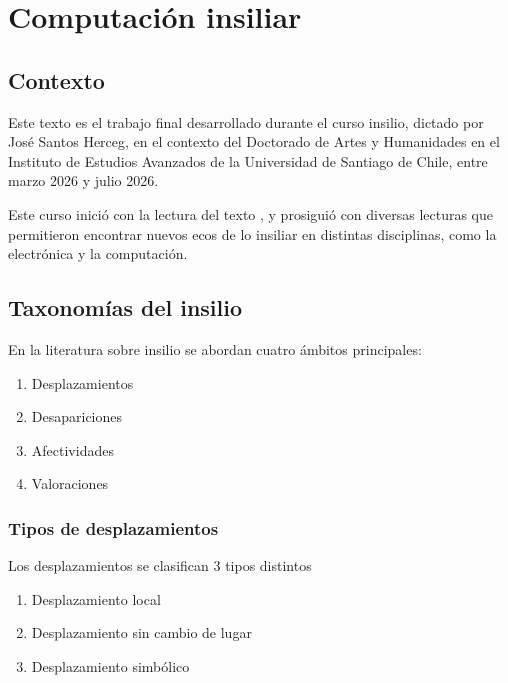 \documentclass[./informes.tex]{subfiles}
\begin{document}

\chapter{Computación insiliar}

\section{Contexto}

Este texto es el trabajo final desarrollado durante el curso insilio, dictado por José Santos Herceg, en el contexto del Doctorado de Artes y Humanidades en el Instituto de Estudios Avanzados de la Universidad de Santiago de Chile, entre marzo 2026 y julio 2026.

Este curso inició con la lectura del texto \cite{inxilioSantos}, y prosiguió con diversas lecturas que permitieron encontrar nuevos ecos de lo insiliar en distintas disciplinas, como la electrónica y la computación.

\printbibliography[
  heading=subbibliography
]

\section{Taxonomías del insilio}

En la literatura sobre insilio se abordan cuatro ámbitos principales:

\begin{enumerate}
  \item Desplazamientos
  \item Desapariciones
  \item Afectividades
  \item Valoraciones
\end{enumerate}

\subsection{Tipos de desplazamientos}

Los desplazamientos se clasifican 3 tipos distintos

\begin{enumerate}
  \item Desplazamiento local
  \item Desplazamiento sin cambio de lugar
  \item Desplazamiento simbólico
\end{enumerate}
\end{document}

